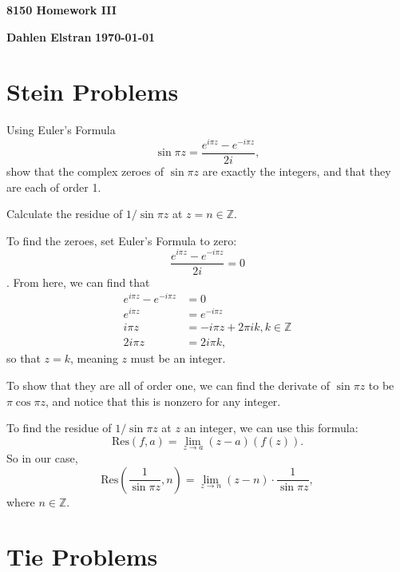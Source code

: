 \documentclass[12pt]{article}
\begin{document}
\begin{newtitle}
  \begin{center}
    \textbf{\Huge 8150 Homework III}
  \end{center}
  \textbf{Dahlen Elstran} \hfill \textbf{\today}
\end{newtitle}

\section*{Stein Problems}

\begin{statement}
  Using Euler's Formula
  $$ \sin \pi z = \frac{e^{i \pi z}-e^{-i \pi z}}{2i}, $$
  show that the complex zeroes of $\sin \pi z$ are exactly the integers, and that they are each of order 1. 
  \par Calculate the residue of $1/\sin \pi z$ at $z=n \in \mathbb{Z}$. 
\end{statement}
\begin{newproof}
  To find the zeroes, set Euler's Formula to zero:
  $$ \frac{e^{i \pi z}-e^{-i \pi z}}{2i} = 0 $$.
  From here, we can find that 
  \begin{align*}
    e^{i \pi z} - e^{-i \pi z} &= 0 \\
    e^{i \pi z} &= e^{-i \pi z} \\ 
    i \pi z &= -i \pi z + 2 \pi i k , k \in \mathbb{Z} \\
    2i \pi z &= 2 i \pi k,
  \end{align*}
  so that $z = k$, meaning $z$ must be an integer. 
  \par To show that they are all of order one, we can find the derivate of $\sin \pi z$ to be 
  $ \pi \cos \pi z$, and notice that this is nonzero for any integer. 
  \par To find the residue of $1 / \sin \pi z$ at $z$ an integer, we can use this formula:
  $$ \text{Res}(f,a)=\lim_{z \to a} (z-a)(f(z)). $$
  So in our case, 
  $$ \text{Res}(\frac{1}{\sin \pi z}, n) = \lim_{z \to n} (z-n) \cdot \frac{1}{\sin \pi z}, $$
  where $n \in \mathbb{Z}$. 
\end{newproof}


\section*{Tie Problems}
\end{document}
